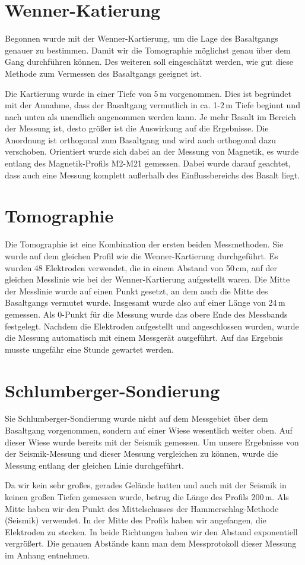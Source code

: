\section{Wenner-Katierung}

Begonnen wurde mit der Wenner-Kartierung, um die Lage des Basaltgangs genauer zu bestimmen. Damit wir die Tomographie möglichst genau über dem Gang durchführen
können. 
Des weiteren soll eingeschätzt werden, wie gut diese Methode zum Vermessen des Basaltgangs geeignet ist.

Die Kartierung wurde in einer Tiefe von 5\,m vorgenommen. Dies ist begründet mit der Annahme, dass der Basaltgang vermutlich in ca. 1-2\,m Tiefe beginnt und nach unten 
als unendlich angenommen werden kann. Je mehr Basalt im Bereich der Messung ist, desto größer ist die Auswirkung auf die Ergebnisse.
Die Anordnung ist orthogonal zum Basaltgang und wird auch orthogonal dazu verschoben. Orientiert wurde sich dabei an der Messung von Magnetik, es wurde 
entlang des Magnetik-Profils M2-M21 gemessen. Dabei wurde darauf geachtet, dass auch eine Messung komplett außerhalb 
des Einflussbereichs des Basalt liegt.

\section{Tomographie}

Die Tomographie ist eine Kombination der ersten beiden Messmethoden. Sie wurde auf dem gleichen Profil wie die Wenner-Kartierung durchgeführt.
Es wurden 48 Elektroden verwendet, die in einem Abstand von 50\,cm, auf der gleichen Messlinie wie bei der Wenner-Kartierung aufgestellt waren. 
Die Mitte der Messlinie wurde auf einen Punkt gesetzt, an dem auch die Mitte des Basaltgangs vermutet wurde. Insgesamt wurde also auf einer Länge von 24\,m gemessen.
Als 0-Punkt für die Messung wurde das obere Ende des Messbands festgelegt.
Nachdem die Elektroden aufgestellt und angeschlossen wurden, wurde die Messung automatisch mit einem Messgerät ausgeführt. Auf das Ergebnis musste ungefähr 
eine Stunde gewartet werden.

\section{Schlumberger-Sondierung}

Sie Schlumberger-Sondierung wurde nicht auf dem Messgebiet über dem Basaltgang vorgenommen, sondern auf einer Wiese wesentlich weiter oben. Auf dieser Wiese wurde 
bereits mit der Seismik gemessen. Um unsere Ergebnisse von der Seismik-Messung und dieser Messung vergleichen zu können, wurde die Messung entlang der gleichen
Linie durchgeführt.

Da wir kein sehr großes, gerades Gelände hatten und auch mit der Seismik in keinen großen Tiefen gemessen wurde, betrug die Länge des Profils 200\,m. Als Mitte 
haben wir den Punkt des Mittelschusses der Hammerschlag-Methode (Seismik) verwendet.
In der Mitte des Profils haben wir angefangen, die Elektroden zu stecken. In beide Richtungen haben wir den Abstand exponentiell vergrößert. Die genauen Abstände kann man dem Messprotokoll dieser Messung im Anhang entnehmen.